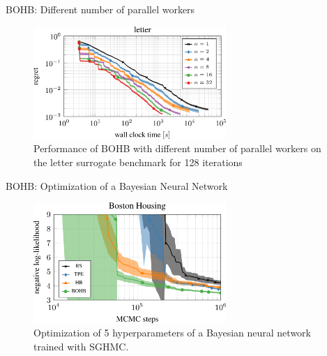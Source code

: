 \begin{frame}{BOHB: Different number of parallel workers}
\begin{figure}
    \centering
    \includegraphics[width=0.65\textwidth]{../w07_hpo_speedup/images/bohb/parallelization_letter.png}
    \caption{Performance of BOHB with different number of parallel workers on the letter surrogate benchmark for 128 iterations}
\end{figure}

\end{frame}
\begin{frame}{BOHB: Optimization of a Bayesian Neural Network}
\begin{figure}
    \centering
    \includegraphics[width=0.65\textwidth]{../w07_hpo_speedup/images/bohb/bnn_boston-1.png}
    \caption{Optimization of 5 hyperparameters of a Bayesian neural network trained with SGHMC.}
\end{figure}

\end{frame}
